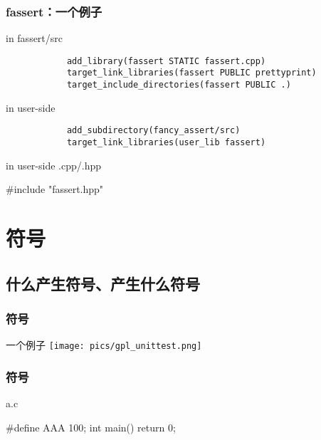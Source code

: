 \documentclass[UTF8,lualatex]{ctexbeamer}
\begin{document}
\begin{frame}[fragile]
    \frametitle{fassert：一个例子}
    \begin{block}{in fassert/src}
        \small
        \begin{verbatim}
            add_library(fassert STATIC fassert.cpp)
            target_link_libraries(fassert PUBLIC prettyprint)
            target_include_directories(fassert PUBLIC .)
        \end{verbatim}
    \end{block}
    \begin{block}{in user-side}
        \small
        \begin{verbatim}
            add_subdirectory(fancy_assert/src)
            target_link_libraries(user_lib fassert)
        \end{verbatim}
    \end{block}
    \begin{block}{in user-side .cpp/.hpp}
        \small
        \begin{cppcode}
            #include "fassert.hpp"
        \end{cppcode}
    \end{block}
\end{frame}


\section{符号}

\subsection{什么产生符号、产生什么符号}

\begin{frame}
    \frametitle{符号}
    \begin{block}{一个例子}
        \texttt{[image: pics/gpl\_unittest.png]}
    \end{block}
\end{frame}


\begin{frame}[fragile,t]
    \frametitle{符号}
    \scriptsize
    \begin{exampleblock}{a.c}
        \begin{cppcode}
            #define AAA 100;
            int main() {
                return 0;
            }
        \end{cppcode}
    \end{exampleblock}
    \begin{block}{~}
    \end{block}
\end{frame}
\end{document}
